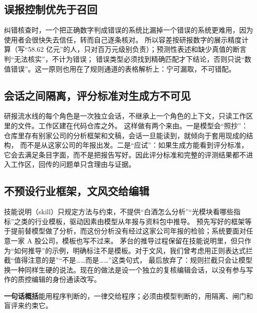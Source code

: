\subsection{误报控制优先于召回}
纠错核查时，一个把正确数字判成错误的系统比漏掉一个错误的系统更难用，因为使用者会很快失去信任，转而自己逐条核对。
所以容差按研报数字的展示精度计算（写“58.62 亿元”的人，只对百万元级别负责）；预测性表述和缺少真值的断言判“无法核实”，不计为错误；
错误类型必须找到精确匹配才下结论，否则只说“数值错误”。这一原则也用在了规则通道的表格解析上：宁可漏取，不可错配。

\subsection{会话之间隔离，评分标准对生成方不可见}
研报流水线的每个角色是一次独立会话，不继承上一个角色的上下文，只读工作区里的文件。工作区建在代码仓库之外。
这样做有两个来由。一是模型会“照抄”：仓库里存有别家公司的分析框架和文稿，会话一旦能读到，就倾向于套用现成的结构，
而不是从这家公司的年报出发。二是“应试”：如果生成方能看到评分标准，它会去满足条目字面，而不是把报告写好。因此评分标准和完整的评测结果都不进入工作区，回传的问题单只含理由与证据。

\subsection{不预设行业框架，文风交给编辑}
技能说明（skill）只规定方法与约束，不提供“白酒怎么分析”“光模块看哪些指标”之类的行业模板，驱动因素由模型从年报与资料包中推导。
预先写好的框架等于提前替模型做了分析，而这份分析没有经过这家公司年报的检验；系统要面对任意一家 A 股公司，模板也写不过来。
茅台的推导过程保留在技能说明里，但只作为“如何推导”的示例，明确标注不是模板。对于文风，我们曾考虑用正则表达式拦截“值得注意的是”“不是……而是……”这类句式，
最后放弃了：规则拦截只会让模型换一种同样生硬的说法。现在的做法是设一个独立的复核编辑会话，以没有参与写作的质控编辑的身份通读改写。

\begin{keybox}
{\heiti\bfseries\color{ink}一句话概括}\quad 能用程序判断的，一律交给程序；必须由模型判断的，用隔离、闸门和盲评来约束它。
\end{keybox}
